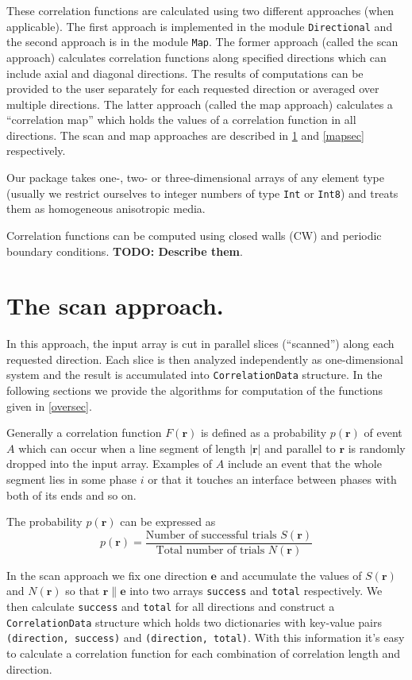 \documentclass[reprint,amsmath,amssymb,aps,pre]{revtex4-1}
\newcommand{\code}[1]{\colorbox{light-gray}{\texttt{#1}}}
\begin{document}
These correlation functions are calculated using two different approaches (when
applicable). The first approach is implemented in the module \code{Directional}
and the second approach is in the module \code{Map}. The former approach (called
the scan approach) calculates correlation functions along specified directions
which can include axial and diagonal directions. The results of computations can
be provided to the user separately for each requested direction or averaged over
multiple directions. The latter approach (called the map approach) calculates a
``correlation map'' which holds the values of a correlation function in all
directions. The scan and map approaches are described in \cref{scansec} and
\cref{mapsec} respectively.

Our package takes one-, two- or three-dimensional arrays of any element type
(usually we restrict ourselves to integer numbers of type \code{Int} or
\code{Int8}) and treats them as homogeneous anisotropic media.

Correlation functions can be computed using closed walls (CW) and periodic
boundary conditions. \textbf{TODO: Describe them}.

\section{The scan approach.}
\label{scansec}
In this approach, the input array is cut in parallel slices (``scanned'') along
each requested direction. Each slice is then analyzed independently as
one-dimensional system and the result is accumulated into \code{CorrelationData}
structure. In the following sections we provide the algorithms for computation
of the functions given in \cref{oversec}.

Generally a correlation function $F(\bm{r})$ is defined as a probability
$p(\bm{r})$ of event $A$ which can occur when a line segment of length
$|\bm{r}|$ and parallel to $\bm{r}$ is randomly dropped into the input
array. Examples of $A$ include an event that the whole segment lies in some
phase $i$ or that it touches an interface between phases with both of its ends
and so on.

The probability $p(\bm{r})$ can be expressed as
\begin{equation*}
  p(\bm{r}) = \frac{\text{Number of successful trials $S(\bm{r})$}}
  {\text{Total number of trials $N(\bm{r})$}}
\end{equation*}

In the scan approach we fix one direction $\bm{e}$ and accumulate the values of
$S(\bm{r})$ and $N(\bm{r})$ so that $\bm{r} \parallel \bm{e}$ into two arrays
\code{success} and \code{total} respectively. We then calculate \code{success}
and \code{total} for all directions and construct a \code{CorrelationData}
structure which holds two dictionaries with key-value pairs
\code{(direction, success)} and \code{(direction, total)}. With this information
it's easy to calculate a correlation function for each combination of
correlation length and direction.
\end{document}
